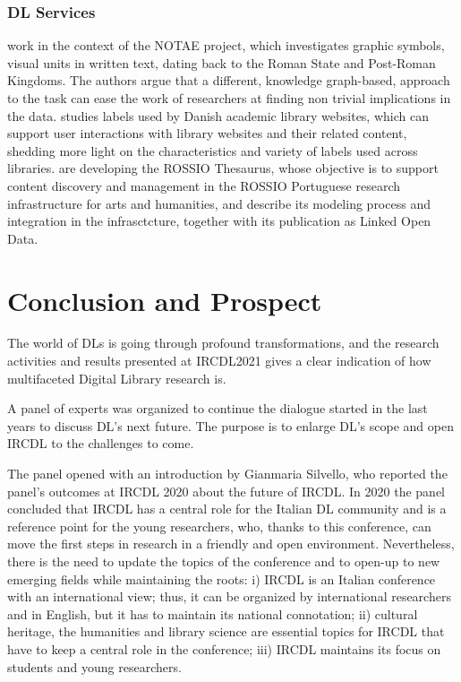 \documentclass[sigconf, nonacm]{acmart}
\begin{document}
\subsubsection*{DL Services}
\citet{BernasconiBCCGL21} work in the context of the NOTAE project, which investigates graphic symbols, visual units in written text, dating back to the Roman State and Post-Roman Kingdoms. The authors argue that a different, knowledge graph-based, approach to the task can ease the work of researchers at finding non trivial implications in the data. 
\citet{Svarre21} studies labels used by Danish academic library websites, which can support user interactions with library websites and their related content, shedding more light on the characteristics and variety of labels used across libraries. 
\citet{AlmeidaFM21} are developing the ROSSIO Thesaurus, whose objective is to support content discovery and management in the ROSSIO Portuguese research infrastructure for arts and humanities, and describe its modeling process and integration in the infrasctcture, together with its publication as Linked Open Data.


\section{Conclusion and Prospect}
The world of DLs is going through profound transformations,
and the research activities and results presented at
IRCDL2021 gives a clear indication of how multifaceted Digital Library research is.

A panel of experts was organized to continue the dialogue started in the last years to discuss DL's next future. The purpose is to enlarge DL's scope and open IRCDL to the challenges to come.

The panel opened with an introduction by Gianmaria Silvello, who reported the panel's outcomes at IRCDL 2020 about the future of IRCDL. In 2020 the panel concluded that IRCDL has a central role for the Italian DL community and is a reference point for the young researchers, who, thanks to this conference, can move the first steps in research in a friendly and open environment. Nevertheless, there is the need to update the topics of the conference and to open-up to new emerging fields while maintaining the roots: i) IRCDL is an Italian conference with an international view; thus, it can be organized by international researchers and in English, but it has to maintain its national connotation; ii) cultural heritage, the humanities and library science are essential topics for IRCDL that have to keep a central role in the conference; iii) IRCDL maintains its focus on students and young researchers. 
\end{document}
